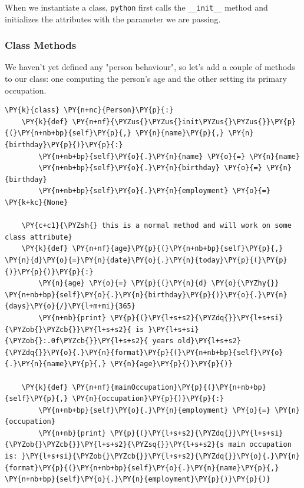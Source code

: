 When we instantiate a class, \texttt{python} first calls the
\texttt{\_\_init\_\_} method and initializes the attributes with
the parameter we are passing.

\subsubsection{Class Methods}

We haven't yet defined any "person behaviour", so let's add a couple
of methods to our class: one computing the person's age and the other
setting its primary occupation.

\begin{codebox}[breakable, size=fbox, boxrule=1pt, pad at break*=1mm,colback=cellbackground, colframe=cellborder]
\begin{Verbatim}[commandchars=\\\{\}]
\PY{k}{class} \PY{n+nc}{Person}\PY{p}{:}
    \PY{k}{def} \PY{n+nf}{\PYZus{}\PYZus{}init\PYZus{}\PYZus{}}\PY{p}{(}\PY{n+nb+bp}{self}\PY{p}{,} \PY{n}{name}\PY{p}{,} \PY{n}{birthday}\PY{p}{)}\PY{p}{:}
        \PY{n+nb+bp}{self}\PY{o}{.}\PY{n}{name} \PY{o}{=} \PY{n}{name}
        \PY{n+nb+bp}{self}\PY{o}{.}\PY{n}{birthday} \PY{o}{=} \PY{n}{birthday}     
        \PY{n+nb+bp}{self}\PY{o}{.}\PY{n}{employment} \PY{o}{=} \PY{k+kc}{None}
                
    \PY{c+c1}{\PYZsh{} this is a normal method and will work on some class attribute}
    \PY{k}{def} \PY{n+nf}{age}\PY{p}{(}\PY{n+nb+bp}{self}\PY{p}{,} \PY{n}{d}\PY{o}{=}\PY{n}{date}\PY{o}{.}\PY{n}{today}\PY{p}{(}\PY{p}{)}\PY{p}{)}\PY{p}{:}
        \PY{n}{age} \PY{o}{=} \PY{p}{(}\PY{n}{d} \PY{o}{\PYZhy{}} \PY{n+nb+bp}{self}\PY{o}{.}\PY{n}{birthday}\PY{p}{)}\PY{o}{.}\PY{n}{days}\PY{o}{/}\PY{l+m+mi}{365}
        \PY{n+nb}{print} \PY{p}{(}\PY{l+s+s2}{\PYZdq{}}\PY{l+s+si}{\PYZob{}\PYZcb{}}\PY{l+s+s2}{ is }\PY{l+s+si}{\PYZob{}:.0f\PYZcb{}}\PY{l+s+s2}{ years old}\PY{l+s+s2}{\PYZdq{}}\PY{o}{.}\PY{n}{format}\PY{p}{(}\PY{n+nb+bp}{self}\PY{o}{.}\PY{n}{name}\PY{p}{,} \PY{n}{age}\PY{p}{)}\PY{p}{)}
        
    \PY{k}{def} \PY{n+nf}{mainOccupation}\PY{p}{(}\PY{n+nb+bp}{self}\PY{p}{,} \PY{n}{occupation}\PY{p}{)}\PY{p}{:}
        \PY{n+nb+bp}{self}\PY{o}{.}\PY{n}{employment} \PY{o}{=} \PY{n}{occupation}
        \PY{n+nb}{print} \PY{p}{(}\PY{l+s+s2}{\PYZdq{}}\PY{l+s+si}{\PYZob{}\PYZcb{}}\PY{l+s+s2}{\PYZsq{}}\PY{l+s+s2}{s main occupation is: }\PY{l+s+si}{\PYZob{}\PYZcb{}}\PY{l+s+s2}{\PYZdq{}}\PY{o}{.}\PY{n}{format}\PY{p}{(}\PY{n+nb+bp}{self}\PY{o}{.}\PY{n}{name}\PY{p}{,} \PY{n+nb+bp}{self}\PY{o}{.}\PY{n}{employment}\PY{p}{)}\PY{p}{)}
\end{Verbatim}
\end{codebox}

